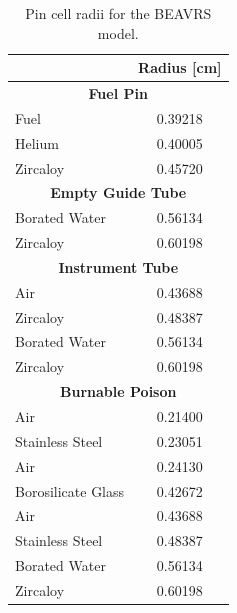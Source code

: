 \begin{table}[h!]
  \centering
  \caption[BEAVRS pin cell radii]{Pin cell radii for the \ac{BEAVRS} model.}
  \small
  \label{table:chap7-pin-cell-radii} 
  \vspace{6pt}
  \begin{tabular}{l c}
  \toprule
  \rowcolor{lightgray}
  \multicolumn{1}{c}{\bf Material} &
  \multicolumn{1}{c}{\bf Radius [cm]} \\
  \midrule
  \multicolumn{2}{c}{\bf Fuel Pin} \\
  \midrule
  Fuel &  0.39218 \\
  Helium & 0.40005 \\
  Zircaloy & 0.45720 \\
  \midrule
  \multicolumn{2}{c}{\bf Empty Guide Tube\footnotemark} \\
  \midrule
  Borated Water & 0.56134 \\
  Zircaloy & 0.60198 \\
  \midrule
  \multicolumn{2}{c}{\bf Instrument Tube} \\
  \midrule
  Air & 0.43688 \\
  Zircaloy & 0.48387 \\
  Borated Water & 0.56134 \\
  Zircaloy & 0.60198 \\
  \midrule
  \multicolumn{2}{c}{\bf Burnable Poison\footnotemark} \\
  \midrule
  Air & 0.21400 \\
  Stainless Steel & 0.23051 \\
  Air & 0.24130 \\
  Borosilicate Glass & 0.42672 \\
  Air & 0.43688 \\
  Stainless Steel & 0.48387 \\
  Borated Water & 0.56134 \\
  Zircaloy & 0.60198 \\
  \bottomrule
\end{tabular}
\end{table}

\addtocounter{footnote}{-2}

